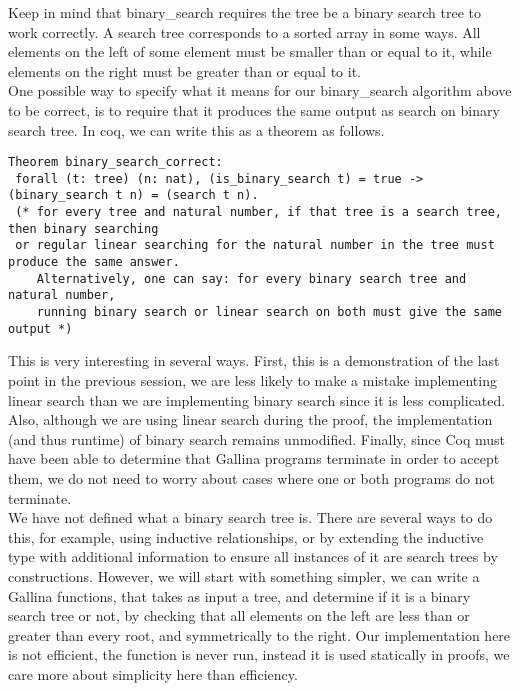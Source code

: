 \documentclass{article}
\begin{document}
Keep in mind that binary\_search requires the tree be a binary search tree
to work correctly. A search tree corresponds to a sorted array in some ways.
All elements on the left of some element must be smaller than or equal to it, 
while elements on the right must be greater than or equal to it. \\

One possible way to specify what it means for our binary\_search algorithm above to
be correct, is to require that it produces the same output as search on binary search tree.
In coq, we can write this as a theorem as follows.
\begin{verbatim}
Theorem binary_search_correct:
 forall (t: tree) (n: nat), (is_binary_search t) = true -> (binary_search t n) = (search t n).
 (* for every tree and natural number, if that tree is a search tree, then binary searching
 or regular linear searching for the natural number in the tree must produce the same answer.
    Alternatively, one can say: for every binary search tree and natural number,
    running binary search or linear search on both must give the same output *)
\end{verbatim}

This is very interesting in several ways. First, this is a demonstration of the last point in the
previous session, we are less likely to make a mistake implementing linear search
than we are implementing binary search since it is less complicated. Also, although we are using
linear search during the proof, the implementation (and thus runtime) of binary search remains
unmodified. Finally, since Coq must have been able to determine that Gallina programs terminate in order
to accept them, we do not need to worry about cases where one or both programs do not terminate. \\

We have not defined what a binary search tree is. There are several ways to do this, for example, using
inductive relationships, or by extending the inductive type with additional information to ensure
all instances of it are search trees by constructions. However, we will start with something simpler, we
can write a Gallina functions, that takes as input a tree, and determine if it is a binary search tree or not,
by checking that all elements on the left are less than or greater than every root, and symmetrically to the right.
Our implementation here is not efficient, the function is never run, instead it is used statically in proofs, we
care more about simplicity here than efficiency. \\
\end{document}

